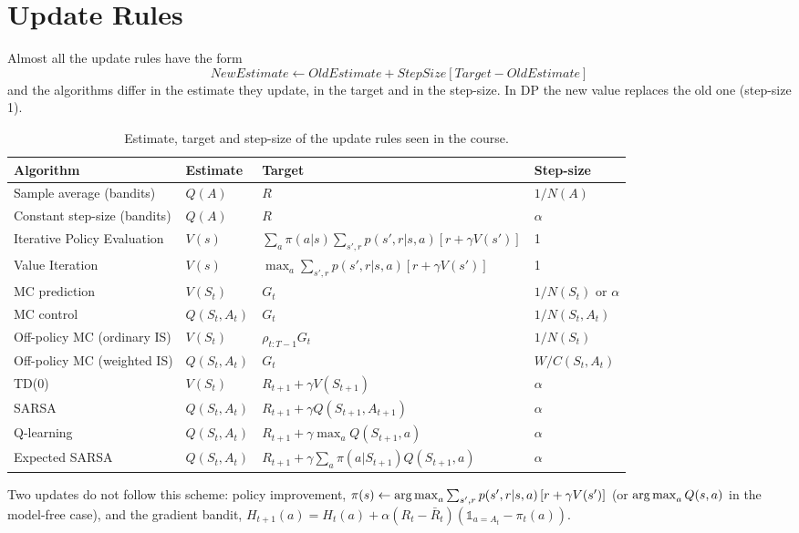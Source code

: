 \section{Update Rules}
Almost all the update rules have the form
\[\textit{NewEstimate}\leftarrow\textit{OldEstimate}+\textit{StepSize}\left[\textit{Target}-\textit{OldEstimate}\right]\]
and the algorithms differ in the estimate they update, in the target and in the step-size. In DP the new value replaces the old one (step-size 1).
\begin{table}[H]
\centering
\footnotesize
\renewcommand{\arraystretch}{1.4}
\begin{tabular}{@{}l l l l@{}}
\toprule
\textbf{Algorithm} & \textbf{Estimate} & \textbf{Target} & \textbf{Step-size} \\
\midrule
Sample average (bandits) & $Q(A)$ & $R$ & $1/N(A)$ \\
Constant step-size (bandits) & $Q(A)$ & $R$ & $\alpha$ \\
Iterative Policy Evaluation & $V(s)$ & $\sum_a\pi(a|s)\sum_{s',r}p(s',r|s,a)\left[r+\gamma V(s')\right]$ & 1 \\
Value Iteration & $V(s)$ & $\max_a\sum_{s',r}p(s',r|s,a)\left[r+\gamma V(s')\right]$ & 1 \\
MC prediction & $V(S_t)$ & $G_t$ & $1/N(S_t)$ or $\alpha$ \\
MC control & $Q(S_t,A_t)$ & $G_t$ & $1/N(S_t,A_t)$ \\
Off-policy MC (ordinary IS) & $V(S_t)$ & $\rho_{t:T-1}G_t$ & $1/N(S_t)$ \\
Off-policy MC (weighted IS) & $Q(S_t,A_t)$ & $G_t$ & $W/C(S_t,A_t)$ \\
TD(0) & $V(S_t)$ & $R_{t+1}+\gamma V(S_{t+1})$ & $\alpha$ \\
SARSA & $Q(S_t,A_t)$ & $R_{t+1}+\gamma Q(S_{t+1},A_{t+1})$ & $\alpha$ \\
Q-learning & $Q(S_t,A_t)$ & $R_{t+1}+\gamma\max_aQ(S_{t+1},a)$ & $\alpha$ \\
Expected SARSA & $Q(S_t,A_t)$ & $R_{t+1}+\gamma\sum_a\pi(a|S_{t+1})Q(S_{t+1},a)$ & $\alpha$ \\
\bottomrule
\end{tabular}
\caption{Estimate, target and step-size of the update rules seen in the course.}
\label{tab:update-rules}
\end{table}
Two updates do not follow this scheme: policy improvement, $\pi(s)\leftarrow\operatorname*{arg\,max}_a\sum_{s',r}p(s',r|s,a)\left[r+\gamma V(s')\right]$ (or $\operatorname*{arg\,max}_aQ(s,a)$ in the model-free case), and the gradient bandit, $H_{t+1}(a)=H_t(a)+\alpha(R_t-\bar R_t)\left(\mathds{1}_{a=A_t}-\pi_t(a)\right)$.

